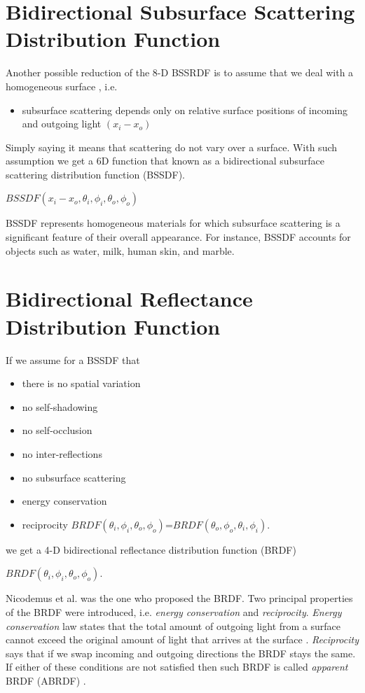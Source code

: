 \section{Bidirectional Subsurface Scattering Distribution Function}
\label{section:BSSDF}

Another possible reduction of the 8-D BSSRDF is to assume that we deal with a homogeneous surface \cite{dong}, i.e.
\begin{itemize}
 \item subsurface scattering depends only on relative surface positions of incoming and outgoing light $(x_{i}-x_{o})$
\end{itemize}
  Simply saying it means that scattering do not vary over a surface.
 With such assumption we get a 6D function that known as a bidirectional subsurface scattering
distribution function (BSSDF).
 \begin{center}
$BSSDF(x_{i}-x_{o},\theta_{i} ,\phi_{i},\theta_{o} ,\phi_{o})$
 \end{center}
 BSSDF represents homogeneous materials for which subsurface scattering is a significant feature of their overall appearance.
 For instance, BSSDF accounts for objects such as water, milk, human skin, and marble.

\section{Bidirectional Reflectance Distribution Function}
\label{section:brdf}

If we assume for a BSSDF that

\begin{itemize}
 \item there is no spatial variation 
 \item no self-shadowing
 \item no self-occlusion
 \item no inter-reflections
 \item no subsurface scattering
 \item energy conservation
 \item reciprocity  $BRDF(\theta_{i} ,\phi_{i},\theta_{o} ,\phi_{o})$=$BRDF(\theta_{o} ,\phi_{o},\theta_{i} ,\phi_{i})$.
\end{itemize}

 we get a 4-D bidirectional reflectance distribution function (BRDF)
 \begin{center}
$BRDF(\theta_{i} ,\phi_{i},\theta_{o} ,\phi_{o})$.
 \end{center}
Nicodemus et al. \cite{Nicodemus} was the one who proposed the BRDF. 
Two principal properties of the BRDF were introduced, i.e. \emph{energy conservation} and \emph{reciprocity}. 
\emph{Energy conservation} law states that the total amount of outgoing light from a surface cannot exceed the
original amount of light that arrives at the surface \cite{wynn}. 
 \emph{Reciprocity} says that if we swap incoming and outgoing directions the BRDF stays the same.
If either of these conditions are not satisfied then such BRDF is called \emph{apparent} BRDF (ABRDF) \cite{abrdf}.

